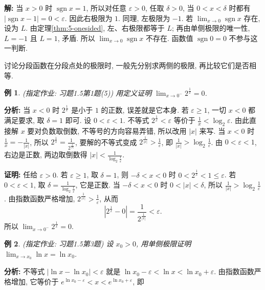 \documentclass[UTF8,openany]{ctexbook}
\theoremstyle{chinesetextbook}
\newtheorem{example}{例}[section]
\newenvironment{cnproof}{\par\indent\textbf{证明:} \ignorespaces}{\par}
\newenvironment{cnsolution}{\par\indent\textbf{解:} \ignorespaces}{\par}
\begin{document}
\begin{cnsolution}
当 $x>0$ 时 $\operatorname{sgn}x=1$, 所以对任意 $\varepsilon>0$, 任取 $\delta>0$, 当 $0<x<\delta$ 时都有 $|\operatorname{sgn}x-1|=0<\varepsilon$. 因此右极限为 $1$. 同理, 左极限为 $-1$. 若 $\displaystyle\lim_{x\to0}\operatorname{sgn}x$ 存在, 设为 $L$. 由定理\ref{thm:5-onesided}, 左、右极限都等于 $L$; 再由单侧极限的唯一性, $L=-1$ 且 $L=1$, 矛盾. 所以 $\displaystyle\lim_{x\to0}\operatorname{sgn}x$ 不存在. 函数值 $\operatorname{sgn}0=0$ 不参与这一判断.
\end{cnsolution}
讨论分段函数在分段点处的极限时, 一般先分别求两侧的极限, 再比较它们是否相等.
\begin{example}\label{ex:h15-1-5}
\textnormal{(指定作业: 习题1.5第1题(5))} 用定义证明 $\displaystyle\lim_{x\to0^-}2^{\frac1x}=0$.
\end{example}
\par\indent\textbf{分析:} 当 $x<0$ 时 $2^{\frac1x}$ 是小于 $1$ 的正数, 误差就是它本身. 若 $\varepsilon\ge1$, 一切 $x<0$ 都满足要求, 取 $\delta=1$ 即可. 设 $0<\varepsilon<1$. 不等式 $2^{\frac1x}<\varepsilon$ 等价于 $\displaystyle\frac1x<\log_2\varepsilon$. 由此直接解 $x$ 要对负数取倒数, 不等号的方向容易弄错, 所以改用 $|x|$ 来写. 当 $x<0$ 时 $\displaystyle\frac1x=-\frac1{|x|}$, 所以 $\displaystyle2^{\frac1x}=\frac1{2^{\frac1{|x|}}}$, 要解的不等式变成 $\displaystyle2^{\frac1{|x|}}>\frac1\varepsilon$, 即 $\displaystyle\frac1{|x|}>\log_2\frac1\varepsilon$. 由 $0<\varepsilon<1$, 右边是正数, 两边取倒数得 $\displaystyle|x|<\frac1{\log_2\frac1\varepsilon}$.
\begin{cnproof}
任给 $\varepsilon>0$. 若 $\varepsilon\ge1$, 取 $\delta=1$, 则 $-\delta<x<0$ 时 $0<2^{\frac1x}<1\le\varepsilon$. 若 $0<\varepsilon<1$, 取 $\displaystyle\delta=\frac1{\log_2\frac1\varepsilon}$, 它是正数. 当 $-\delta<x<0$ 时 $0<|x|<\delta$, 所以 $\displaystyle\frac1{|x|}>\log_2\frac1\varepsilon$. 由指数函数严格增加, $\displaystyle2^{\frac1{|x|}}>\frac1\varepsilon$, 从而
\[
\left|2^{\frac1x}-0\right|=\frac1{2^{\frac1{|x|}}}<\varepsilon.
\]
所以 $\displaystyle\lim_{x\to0^-}2^{\frac1x}=0$.
\end{cnproof}
\begin{example}\label{ex:h15-3}
\textnormal{(指定作业: 习题1.5第3题)} 设 $x_0>0$, 用单侧极限证明 $\displaystyle\lim_{x\to x_0}\ln x=\ln x_0$.
\end{example}
\par\indent\textbf{分析:} 不等式 $|\ln x-\ln x_0|<\varepsilon$ 就是 $\ln x_0-\varepsilon<\ln x<\ln x_0+\varepsilon$. 由指数函数严格增加, 它等价于 $e^{\ln x_0-\varepsilon}<x<e^{\ln x_0+\varepsilon}$, 即
\end{document}
